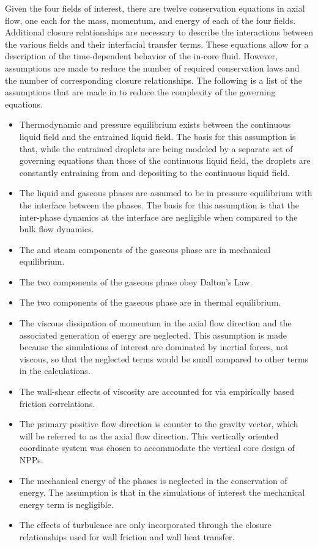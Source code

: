 Given the four fields of interest, there are twelve conservation equations in axial flow, one each for the mass, momentum, and energy of each of the four fields.
Additional closure relationships are necessary to describe the interactions between the various fields and their interfacial transfer terms.
These equations allow for a description of the time-dependent behavior of the in-core fluid.
However, assumptions are made to reduce the number of required conservation laws and the number of corresponding closure relationships.
The following is a list of the assumptions that are made in \cobra{} to reduce the complexity of the governing equations.

\begin{itemize}
\item{
Thermodynamic and pressure equilibrium exists between the continuous liquid field and the entrained liquid field.
The basis for this assumption is that, while the entrained droplets are being modeled by a separate set of governing equations than those of the continuous liquid field, the droplets are constantly entraining from and depositing to the continuous liquid field. 
}
\item{
The liquid and gaseous phases are assumed to be in pressure equilibrium with the interface between the phases.
The basis for this assumption is that the inter-phase dynamics at the interface are negligible when compared to the bulk flow dynamics.
}
\item{The \ncg{} and steam components of the gaseous phase are in mechanical equilibrium.}
\item{The two components of the gaseous phase obey Dalton's Law.}
\item{The two components of the gaseous phase are in thermal equilibrium.}
\item{
The viscous dissipation of momentum in the axial flow direction and the associated generation of energy are neglected.
This assumption is made because the simulations of interest are dominated by inertial forces, not viscous, so that the neglected terms would be small compared to other terms in the calculations.
}
\item{
The wall-shear effects of viscosity are accounted for via empirically based friction correlations.
}
\item{
The primary positive flow direction is counter to the gravity vector, which will be referred to as the axial flow direction. This vertically oriented coordinate system was chosen to accommodate the vertical core design of NPPs.}
\item{
The mechanical energy of the phases is neglected in the conservation of energy. 
The assumption is that in the simulations of interest the mechanical energy term is negligible.
}
\item{
The effects of turbulence are only incorporated through the closure relationships used for wall friction and wall heat transfer.
}
\end{itemize}

